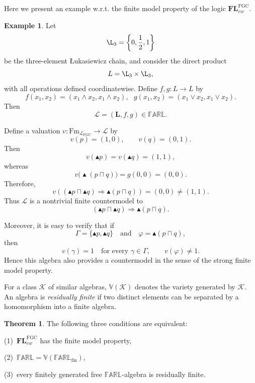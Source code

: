 \documentclass[final,12pt,times]{elsarticle}
\theoremstyle{plain}
\theoremstyle{definition}
\newtheorem{theorem}[definition]{Theorem}
\newtheorem{example}[definition]{Example}
\theoremstyle{break}
\newcommand{\FARL}{\mathbb{FARL}}
\begin{document}
Here we present an example w.r.t. the finite model property of the logic $\mathbf{FL}^{\mathrm{FGC}}_{ew}$.
\begin{example}\label{example:nontrivial-finite-countermodel}
Let
\[
\L_3=\left\{0,\frac{1}{2},1\right\}
\]
be the three-element \L ukasiewicz chain, and consider the
direct product
\[
L=\L_3\times\L_3,
\]
with all operations defined coordinatewise. Define
\(f,g:L\rightarrow L\) by
\[
f(x_1,x_2)
=
(x_1\wedge x_2,x_1\wedge x_2),~~~
g(x_1,x_2)
=
(x_1\vee x_2,x_1\vee x_2).
\]
Then
\[
\mathscr{L}=(\mathbf{L},f,g)\in\FARL.
\]

Define a valuation $v:\mathrm{Fm}_{\mathcal L_{\mathrm{FGC}}}\to\mathscr{L}$ by
\[
v(p)=(1,0),
\qquad
v(q)=(0,1).
\]
Then
\[
v(\blacktriangle p)
=
v(\blacktriangle q)
=
(1,1),
\]
whereas
\[
v\bigl(\blacktriangle(p\sqcap q)\bigr)
=
g(0,0)
=
(0,0).
\]
Therefore,
\[
v\left(
(\blacktriangle p\sqcap\blacktriangle q)
\Rightarrow
\blacktriangle(p\sqcap q)
\right)
=
(0,0)\neq(1,1).
\]
Thus $\mathscr{L}$ is a nontrivial finite countermodel to 
\[
(\blacktriangle p\sqcap\blacktriangle q)
\Rightarrow
\blacktriangle(p\sqcap q).
\]

Moreover, it is easy to verify that if
\[
\Gamma=\{\blacktriangle p,\blacktriangle q\}
\quad\text{and}\quad
\varphi=\blacktriangle(p\sqcap q),
\]
then
\[
v(\gamma)=1
\quad\text{for every }\gamma\in\Gamma,
\qquad
v(\varphi)\neq1.
\]
Hence this algebra also provides a countermodel
in the sense of the strong finite model property.
\end{example}

For a class $\mathcal K$ of similar algebras, $\mathbb V(\mathcal K)$ denotes
the variety generated by $\mathcal K$.  An algebra is \emph{residually finite}
if two distinct elements can be separated by a homomorphism into a finite
algebra.

\begin{theorem}\label{thm:FMP-characterization}
The following three conditions are equivalent:

  (1)~$\mathbf{FL}^{\mathrm{FGC}}_{ew}$ has the finite model property,
  
  (2)~$\FARL=\mathbb V(\FARL_{\mathrm{fin}})$,
  
  (3)~every finitely generated free $\FARL$-algebra is residually
 finite.

\end{theorem}
\end{document}
